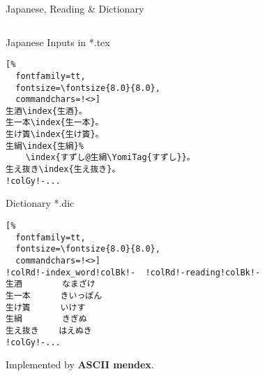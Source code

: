 \documentclass[aspectratio=169,10pt]{beamer}
\begin{document}
\begin{frame}[fragile]{Japanese, Reading \& Dictionary}

\begin{columns}
\begin{column}{57mm}
\begin{exampleblock}{Japanese Inputs in *.tex}
\begin{Verbatim}[%
  fontfamily=tt,
  fontsize=\fontsize{8.0}{8.0},
  commandchars=!<>]
生酒\index{生酒}。
生一本\index{生一本}。
生け簀\index{生け簀}。
生絹\index{生絹}%
    \index{すずし@生絹\YomiTag{すずし}}。
生え抜き\index{生え抜き}。
!colGy!-...
\end{Verbatim}
\end{exampleblock}
\begin{exampleblock}{Dictionary *.dic}
\begin{Verbatim}[%
  fontfamily=tt,
  fontsize=\fontsize{8.0}{8.0},
  commandchars=!<>]
!colRd!-index_word!colBk!-  !colRd!-reading!colBk!-
生酒        なまざけ
生一本      きいっぽん
生け簀      いけす
生絹        きぎぬ
生え抜き    はえぬき
!colGy!-...
\end{Verbatim}
\end{exampleblock}
{\footnotesize Implemented by \textbf{ASCII mendex}.}
\end{column}

\begin{column}{82mm}
\begin{center}
%
\end{center}
\end{column}
\end{columns}

\end{frame}

\end{document}
